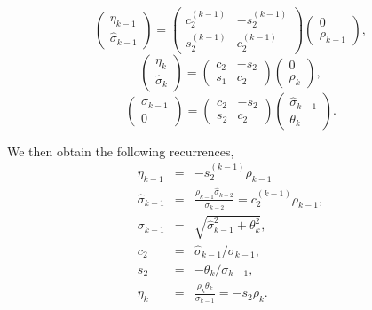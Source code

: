 \documentclass[11pt]{article}
\begin{document}
\[ \begin{pmatrix} \eta_{k-1} \\ \hat{\sigma}_{k-1} \end{pmatrix}
= \begin{pmatrix}  c^{(k-1)}_2 & -s^{(k-1)}_2 \\
 s^{(k-1)}_2 & c^{(k-1)}_2 \end{pmatrix}
\begin{pmatrix} 0 \\ \rho_{k-1} \end{pmatrix},
\]
\[ \begin{pmatrix} \eta_{k} \\ \hat{\sigma}_{k} \end{pmatrix}
= \begin{pmatrix}  c_2 & -s_2 \\ s_1 & c_2 \end{pmatrix}
\begin{pmatrix} 0 \\ \rho_{k} \end{pmatrix},
\]
\[ \begin{pmatrix} \sigma_{k-1} \\ 0 \end{pmatrix}
= \begin{pmatrix}  c_2 & -s_2 \\ s_2 & c_2 \end{pmatrix}
\begin{pmatrix} \hat{\sigma}_{k-1} \\ \theta_k \end{pmatrix}.
\]

We then obtain the following recurrences,
\begin{eqnarray}
\eta_{k-1} &=& -s^{(k-1)}_2 \rho_{k-1} \\
\hat{\sigma}_{k-1} &=& \frac{\rho_{k-1}\hat{\sigma}_{k-2}}{\sigma_{k-2}} = c^{(k-1)}_2\rho_{k-1}, \\
\sigma_{k-1} &=& \sqrt{\hat{\sigma}^2_{k-1} + \theta^2_k }, \\
c_2 &=& \hat{\sigma}_{k-1}/\sigma_{k-1}, \\
s_2 &=& -\theta_k/\sigma_{k-1}, \\
\eta_k &=& \frac{\rho_k\theta_k}{\sigma_{k-1}} = -s_2\rho_k. \\
\end{eqnarray}
\end{document}
